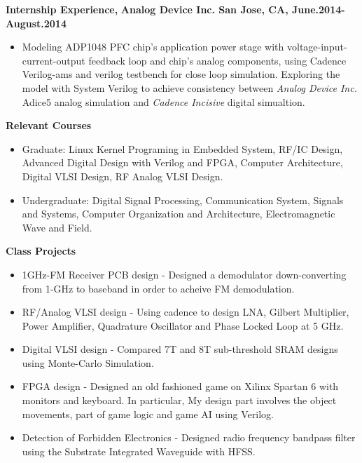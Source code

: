 \documentclass[]{article}
\begin{document}
\noindent \textbf{Internship Experience,}
\textbf{Analog Device Inc. San Jose, CA, June.2014-August.2014}
    \begin{itemize}
        \item Modeling ADP1048 PFC chip's application power stage with
        voltage-input-current-output feedback loop and chip's analog components,
        using Cadence Verilog-ams and verilog testbench for close loop
        simulation. Exploring the model with System Verilog to achieve
        consistency between \textit{Analog Device Inc.} Adice5 analog simulation
        and \textit{Cadence Incisive} digital simualtion. 
    \end{itemize}

\noindent \textbf{Relevant Courses}
\begin{itemize}
\item Graduate:
                    Linux Kernel Programing in Embedded System, RF/IC Design,
                    Advanced Digital Design with Verilog and FPGA, Computer
                    Architecture, Digital VLSI Design, RF Analog VLSI Design. 
\item Undergraduate:
                    Digital Signal Processing, Communication System, Signals
                    and Systems, Computer Organization and 
                    Architecture, Electromagnetic Wave and Field. 
\end{itemize}


\noindent \textbf{Class Projects}
\begin{itemize}

\item 1GHz-FM Receiver PCB design -
Designed a demodulator down-converting from 1-GHz to baseband in order to
acheive FM demodulation.

\item RF/Analog VLSI design -
Using cadence to design LNA, Gilbert Multiplier, Power Amplifier, Quadrature
Oscillator and Phase Locked Loop at 5 GHz.

\item Digital VLSI design - 
Compared 7T and 8T sub-threshold SRAM designs using Monte-Carlo Simulation.

\item FPGA design - 
Designed an old fashioned game on Xilinx Spartan 6 with monitors and keyboard.
In particular, My design part involves the object movements, part of game logic
and game AI using Verilog.


\item Detection of Forbidden Electronics -
Designed radio frequency bandpass filter using the Substrate Integrated
Waveguide with HFSS.


\end{itemize}
\end{document}
